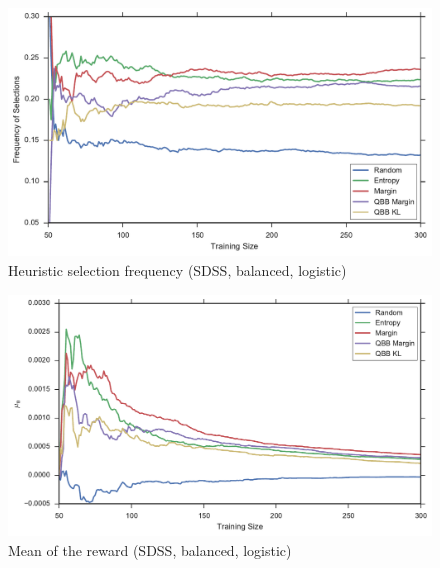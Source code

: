 \begin{figure}[p]
	\centering
	\includegraphics[width=\textwidth]{figures/5_thompson/sdss_bl_frequencies}
	\caption[Heuristic selection frequency (SDSS, balanced, logistic)]{
		Heuristic selection frequency (SDSS, balanced, logistic)}
	\label{fig:sdss_bl_frequencies}
\end{figure}

\begin{figure}[p]
	\centering
	\includegraphics[width=\textwidth]{figures/5_thompson/sdss_bl_mus}
	\caption[Mean of the reward (SDSS, balanced, logistic)]{
		Mean of the reward (SDSS, balanced, logistic)}
	\label{fig:sdss_bl_mus}
\end{figure}

